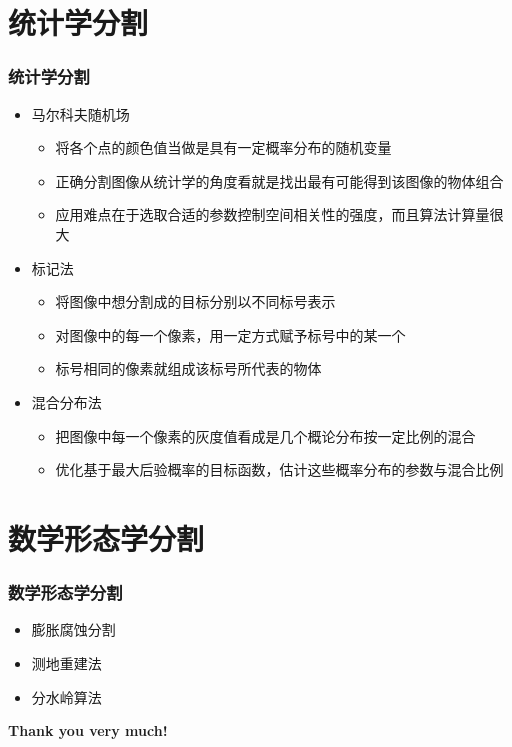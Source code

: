 \documentclass[notheorems,mathserif,table,compress]{beamer}  %
\begin{document}
\section{统计学分割}
\begin{frame}
   \frametitle{统计学分割}
   \begin{itemize}
   \item 马尔科夫随机场
       \begin{itemize}
       \item 将各个点的颜色值当做是具有一定概率分布的随机变量
       \item 正确分割图像从统计学的角度看就是找出最有可能得到该图像的物体组合
       \item 应用难点在于选取合适的参数控制空间相关性的强度，而且算法计算量很大
       \end{itemize}
   \item 标记法
       \begin{itemize}
       \item 将图像中想分割成的目标分别以不同标号表示
       \item 对图像中的每一个像素，用一定方式赋予标号中的某一个
       \item 标号相同的像素就组成该标号所代表的物体
       \end{itemize}
   \item 混合分布法
       \begin{itemize}
       \item 把图像中每一个像素的灰度值看成是几个概论分布按一定比例的混合
       \item 优化基于最大后验概率的目标函数，估计这些概率分布的参数与混合比例
       \end{itemize}
   \end{itemize}
\end{frame}

\section{数学形态学分割}
\begin{frame}
   \frametitle{数学形态学分割}
   \begin{itemize}
   \item 膨胀腐蚀分割
   \item 测地重建法
   \item 分水岭算法
   \end{itemize}
\end{frame}

\begin{frame}
   \begin{Huge}
   \textbf{Thank you very much!}
   \end{Huge}
\end{frame}
\end{document}

